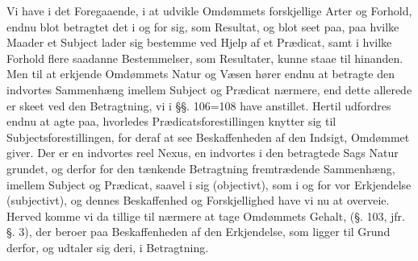 \documentclass[12pt]{book}
\def\textit#1{#1}%
\def\emph#1{#1}%
\newcommand{\opage}[1]{\marginnote{\footnotesize\textit{[#1]}}}
\begin{document}
Vi have i det Foregaaende, i at udvikle Omdømmets forskjellige Arter og
Forhold, endnu blot betragtet det i og for sig, som Resultat, og blot seet paa,
paa hvilke Maader et Subject lader sig bestemme ved Hjelp af et Prædicat, samt
i hvilke Forhold flere saadanne Bestemmelser, som Resultater, kunne staae til
hinanden. Men til at erkjende Omdømmets Natur og Væsen hører endnu at betragte
den \emph{indvortes Sammenhæng imellem Subject og Prædicat} nærmere, end dette
allerede er skeet ved den Betragtning, vi i §§. 106=108 have anstillet. Hertil
udfordres endnu at agte paa, \emph{hvorledes Prædicatsforestillingen knytter
sig til Subjectsforestillingen, for deraf at see Beskaffenheden af den Indsigt,
Omdømmet giver.} \emph{Der er en indvortes reel Nexus, en indvortes i den
betragtede Sags Natur grundet, og derfor for den tænkende Betragtning
fremtrædende}
\opage{299} \emph{Sammenhæng, imellem Subject og Prædicat,} saavel i sig (objectivt), som i
og for vor Erkjendelse (subjectivt), og dennes Beskaffenhed og Forskjellighed
have vi nu at overveie. Herved komme vi da tillige til nærmere at tage
Omdømmets Gehalt, (§. 103, jfr. §. 3), der beroer paa Beskaffenheden af den
Erkjendelse, som ligger til Grund derfor, og udtaler sig deri, i Betragtning.
\end{document}
